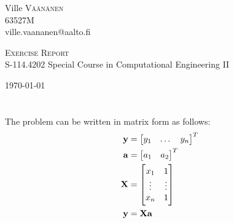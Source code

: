 \documentclass[a4paper,oneside,article]{memoir}
\author{Ville Väänänen}
\newcommand{\course}{S-114.4202}
\newcommand{\coursename}{Special Course in Computational Engineering II}
\newcommand{\studentid}{63527M}
\renewcommand{\title}{Exercise Report}
\begin{document}
\begin{titlingpage}
	\begin{adjustwidth}{-0.6in}{-0.6in}
	\begin{center}
			\begin{flushright} \large
			Ville \textsc{Väänänen}\\
			\studentid\\
			ville.vaananen@aalto.fi
			\end{flushright}
		\vspace{8.0cm}
		
		\textsc{\LARGE \title}
		\HRule \\[0.19cm]
		{\large \course\: \coursename}
		
		\vfill
		\today
	\end{center}
	\end{adjustwidth}
\end{titlingpage}
\newpage


\section{}
\subsection{}
\subsubsection{}

The problem can be written in matrix form as follows:
\begin{align*}
	\mathbf{y} &= \begin{bmatrix} y_1 & \dots & y_n \end{bmatrix}^T \\
	\mathbf{a} &= \begin{bmatrix} a_1 & a_2 \end{bmatrix}^T \\	
	\mathbf{X} &= \begin{bmatrix} 
				x_1 & 1 \\
				\vdots & \vdots \\
				x_n & 1 
	\end{bmatrix} \\
	\mathbf{y} &= \mathbf{Xa}
\end{align*}
\end{document}
